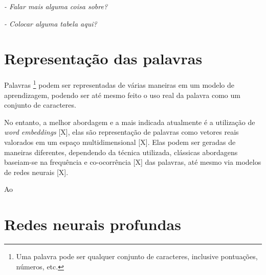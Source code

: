\textit{- Falar mais alguma coisa sobre?}

\textit{- Colocar alguma tabela aqui?}



\section{Representação das palavras}

Palavras \footnote{Uma palavra pode ser qualquer conjunto de caracteres, inclusive pontuações, números, etc.} podem ser representadas de várias maneiras em um modelo de aprendizagem, podendo ser até mesmo feito o uso real da palavra como um conjunto de caracteres.

No entanto, a melhor abordagem e a mais indicada atualmente é a utilização de \textit{word embeddings} [X], elas são representação de palavras como vetores reais valorados em um espaço multidimensional [X]. Elas podem ser geradas de maneiras diferentes, dependendo da técnica utilizada, clássicas abordagens baseiam-se na frequência e co-ocorrência [X] das palavras, até mesmo via modelos de redes neurais [X].

Ao 


\section{Redes neurais profundas}